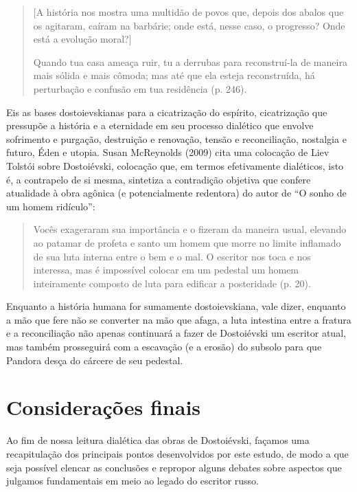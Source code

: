 \begin{quote}
{[}A história nos mostra uma multidão de povos que, depois dos abalos
que os agitaram, caíram na barbárie; onde está, nesse caso, o progresso?
Onde está a evolução moral?{]}

Quando tua casa ameaça ruir, tu a derrubas para reconstruí-la de maneira
mais sólida e mais cômoda; mas até que ela esteja reconstruída, há
perturbação e confusão em tua residência (p. 246).
\end{quote}

Eis as bases dostoievskianas para a cicatrização do espírito,
cicatrização que pressupõe a história e a eternidade em seu processo
dialético que envolve sofrimento e purgação, destruição e renovação,
tensão e reconciliação, nostalgia e futuro, Éden e utopia. Susan
McReynolds (2009) cita uma colocação de Liev Tolstói sobre Dostoiévski,
colocação que, em termos efetivamente dialéticos, isto é, a contrapelo
de si mesma, sintetiza a contradição objetiva que confere atualidade à
obra agônica (e potencialmente redentora) do autor de ``O sonho de um
homem ridículo'':

\begin{quote}
Vocês exageraram sua importância e o fizeram da maneira usual, elevando
ao patamar de profeta e santo um homem que morre no limite inflamado de
sua luta interna entre o bem e o mal. O escritor nos toca e nos
interessa, mas é impossível colocar em um pedestal um homem inteiramente
composto de luta para edificar a posteridade (p. 20).
\end{quote}

Enquanto a história humana for sumamente dostoievskiana, vale dizer,
enquanto a mão que fere não se converter na mão que afaga, a luta
intestina entre a fratura e a reconciliação não apenas continuará a
fazer de Dostoiévski um escritor atual, mas também prosseguirá com a
escavação (e a erosão) do subsolo para que Pandora desça do cárcere de
seu pedestal.

\chapter*{Considerações finais}



Ao fim de nossa leitura dialética das obras de Dostoiévski, façamos uma
recapitulação dos principais pontos desenvolvidos por este estudo, de
modo a que seja possível elencar as conclusões e repropor alguns debates
sobre aspectos que julgamos fundamentais em meio ao legado do escritor
russo.

